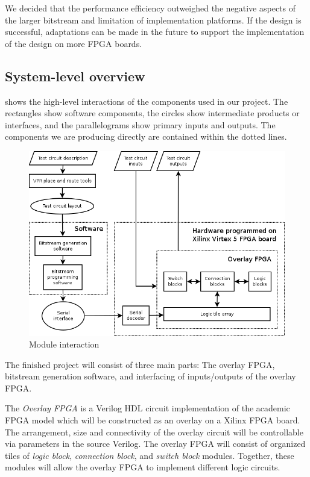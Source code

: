 We decided that the performance efficiency outweighed the negative aspects of the larger bitstream and limitation of implementation platforms.
If the design is successful, adaptations can be made in the future to support the implementation of the design on more FPGA boards.



\subsection{System-level overview} %
\label{system-overview}

 shows the high-level interactions of the components used in our project.
The rectangles show software components, the circles show intermediate products or interfaces, and the parallelograms show primary inputs and outputs.
The components we are producing directly are contained within the dotted lines.

\begin{figure}[!h]
	\centering
	\includegraphics[scale=0.6]{modules.png}
	\caption{Module interaction}
	\label{module-diagram}
\end{figure}

The finished project will consist of three main parts: The overlay FPGA, bitstream generation software, and interfacing of inputs/outputs of the overlay FPGA.

The \emph{Overlay FPGA} is a Verilog HDL circuit implementation of the academic FPGA model which will be constructed as an overlay on a Xilinx FPGA board.
The arrangement, size and connectivity of the overlay circuit will be controllable via parameters in the source Verilog.
The overlay FPGA will consist of organized tiles of \emph{logic block}, \emph{connection block}, and \emph{switch block} modules.
Together, these modules will allow the overlay FPGA to implement different logic circuits.

